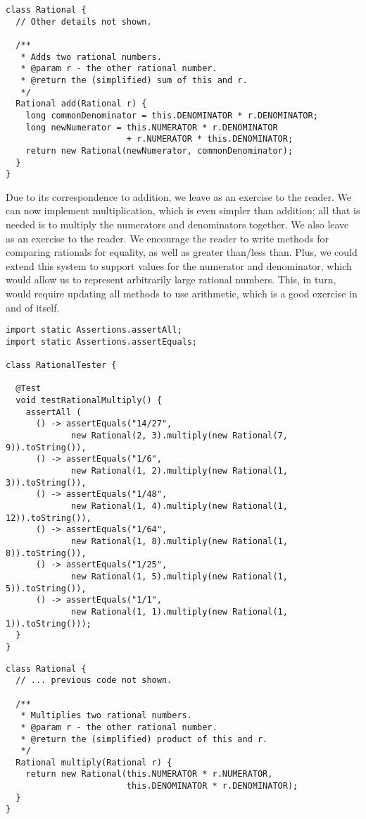 \begin{lstlisting}[language=MyJava]
class Rational {
  // Other details not shown.

  /**
   * Adds two rational numbers.
   * @param r - the other rational number.
   * @return the (simplified) sum of this and r.
   */
  Rational add(Rational r) {
    long commonDenominator = this.DENOMINATOR * r.DENOMINATOR;
    long newNumerator = this.NUMERATOR * r.DENOMINATOR 
                        + r.NUMERATOR * this.DENOMINATOR;
    return new Rational(newNumerator, commonDenominator);
  }
}
\end{lstlisting}

Due to its correspondence to addition, we leave  as an exercise to the reader. 
We can now implement multiplication, which is even simpler than addition; all that is needed is to multiply the numerators and denominators together. 
We also leave  as an exercise to the reader. 
We encourage the reader to write methods for comparing rationals for equality, as well as greater than/less than. 
Plus, we could extend this system to support  values for the numerator and denominator, which would allow us to represent arbitrarily large rational numbers. 
This, in turn, would require updating all methods to use  arithmetic, which is a good exercise in and of itself.

\begin{lstlisting}[language=MyJava]
import static Assertions.assertAll;
import static Assertions.assertEquals;

class RationalTester {

  @Test
  void testRationalMultiply() {
    assertAll (
      () -> assertEquals("14/27", 
             new Rational(2, 3).multiply(new Rational(7, 9)).toString()),
      () -> assertEquals("1/6", 
             new Rational(1, 2).multiply(new Rational(1, 3)).toString()),
      () -> assertEquals("1/48", 
             new Rational(1, 4).multiply(new Rational(1, 12)).toString()),
      () -> assertEquals("1/64", 
             new Rational(1, 8).multiply(new Rational(1, 8)).toString()),
      () -> assertEquals("1/25", 
             new Rational(1, 5).multiply(new Rational(1, 5)).toString()),
      () -> assertEquals("1/1", 
             new Rational(1, 1).multiply(new Rational(1, 1)).toString()));
  }
}
\end{lstlisting}

\begin{lstlisting}[language=MyJava]
class Rational {
  // ... previous code not shown.

  /**
   * Multiplies two rational numbers.
   * @param r - the other rational number.
   * @return the (simplified) product of this and r.
   */
  Rational multiply(Rational r) {
    return new Rational(this.NUMERATOR * r.NUMERATOR, 
                        this.DENOMINATOR * r.DENOMINATOR);
  }
}
\end{lstlisting}

